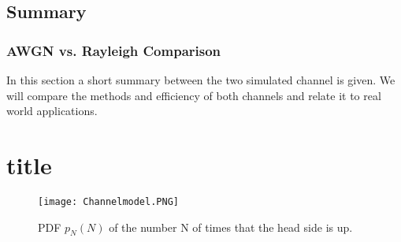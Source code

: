 \chapter{Summary} \label{chap:ending}
\graphicspath{{C:/Users/Kevin/Bachelarbeit/Bachelorarbeit/01_Bachelorarbeit_LaTex/02_Figures/}}
\section{AWGN vs. Rayleigh Comparison}
In this section a short summary between the two simulated channel is given. We will compare the methods and efficiency of both channels and relate it to real world applications. 
\part{title}

\begin{figure}[!htb]
    \centering
    \texttt{[image: Channelmodel.PNG]}
    \caption{PDF $p_N(N)$ of the number N of times that the head side is up.}
    \label{fig:coin_bino}
\end{figure}



\clearpage
